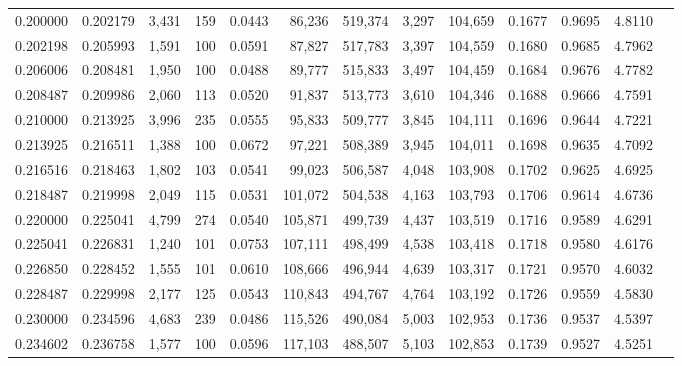 \begin{tabular}{rrrrrrrrrrrrr}
0.200000 & 0.202179 & 3,431 & 159 &                                     0.0443 &  86,236 & 519,374 &   3,297 & 104,659 & 0.1677 & 0.9695 & 4.8110 \\
0.202198 & 0.205993 & 1,591 & 100 &                                     0.0591 &  87,827 & 517,783 &   3,397 & 104,559 & 0.1680 & 0.9685 & 4.7962 \\
0.206006 & 0.208481 & 1,950 & 100 &                                     0.0488 &  89,777 & 515,833 &   3,497 & 104,459 & 0.1684 & 0.9676 & 4.7782 \\
0.208487 & 0.209986 & 2,060 & 113 &                                     0.0520 &  91,837 & 513,773 &   3,610 & 104,346 & 0.1688 & 0.9666 & 4.7591 \\
0.210000 & 0.213925 & 3,996 & 235 &                                     0.0555 &  95,833 & 509,777 &   3,845 & 104,111 & 0.1696 & 0.9644 & 4.7221 \\
0.213925 & 0.216511 & 1,388 & 100 &                                     0.0672 &  97,221 & 508,389 &   3,945 & 104,011 & 0.1698 & 0.9635 & 4.7092 \\
0.216516 & 0.218463 & 1,802 & 103 &                                     0.0541 &  99,023 & 506,587 &   4,048 & 103,908 & 0.1702 & 0.9625 & 4.6925 \\
0.218487 & 0.219998 & 2,049 & 115 &                                     0.0531 & 101,072 & 504,538 &   4,163 & 103,793 & 0.1706 & 0.9614 & 4.6736 \\
0.220000 & 0.225041 & 4,799 & 274 &                                     0.0540 & 105,871 & 499,739 &   4,437 & 103,519 & 0.1716 & 0.9589 & 4.6291 \\
0.225041 & 0.226831 & 1,240 & 101 &                                     0.0753 & 107,111 & 498,499 &   4,538 & 103,418 & 0.1718 & 0.9580 & 4.6176 \\
0.226850 & 0.228452 & 1,555 & 101 &                                     0.0610 & 108,666 & 496,944 &   4,639 & 103,317 & 0.1721 & 0.9570 & 4.6032 \\
0.228487 & 0.229998 & 2,177 & 125 &                                     0.0543 & 110,843 & 494,767 &   4,764 & 103,192 & 0.1726 & 0.9559 & 4.5830 \\
0.230000 & 0.234596 & 4,683 & 239 &                                     0.0486 & 115,526 & 490,084 &   5,003 & 102,953 & 0.1736 & 0.9537 & 4.5397 \\
0.234602 & 0.236758 & 1,577 & 100 &                                     0.0596 & 117,103 & 488,507 &   5,103 & 102,853 & 0.1739 & 0.9527 & 4.5251 \\

\end{tabular}
